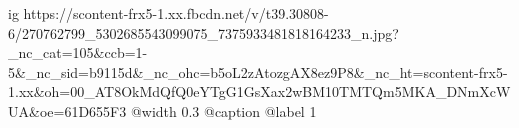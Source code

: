  
 
 
 
 

\ifcmt
  ig https://scontent-frx5-1.xx.fbcdn.net/v/t39.30808-6/270762799_5302685543099075_7375933481818164233_n.jpg?_nc_cat=105&ccb=1-5&_nc_sid=b9115d&_nc_ohc=b5oL2zAtozgAX8ez9P8&_nc_ht=scontent-frx5-1.xx&oh=00_AT8OkMdQfQ0eYTgG1GsXax2wBM10TMTQm5MKA_DNmXcWUA&oe=61D655F3
  @width 0.3
	@caption @label 1
\fi
